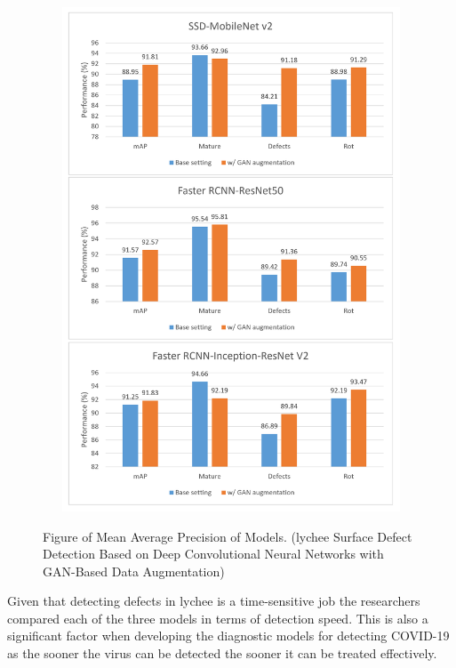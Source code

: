  \begin{figure}[H]
    \centering
    \includegraphics[width=1\textwidth,height=15cm,keepaspectratio]{Images/MeanAvgPrecisionlychee.png}\\
    \caption{Figure of Mean Average Precision of Models. (lychee Surface Defect Detection Based on Deep Convolutional Neural Networks with GAN-Based Data Augmentation)\cite{litReviewLychee}}
    \label{fig:Figure of Mean Average Precision of models (lychee Surface Defect Detection Based on Deep Convolutional Neural Networks with GAN-Based Data Augmentation) }
\end{figure}
Given that detecting defects in lychee is a time-sensitive job the researchers compared each of the three models in terms of detection speed.  This is also a significant factor when developing the diagnostic models for detecting COVID-19 as the sooner the virus can be detected the sooner it can be treated effectively.
